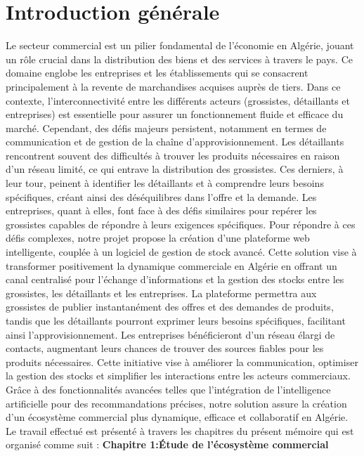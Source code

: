 \documentclass[edit,12pt,a4paper,ChapStyle,oneside,doubleinterligne]{report}
\begin{document}
\chapter*{Introduction générale}
Le secteur commercial est un pilier fondamental de l'économie en Algérie, jouant un rôle crucial dans la distribution des biens et des services à travers le pays. Ce domaine englobe les entreprises et les établissements qui se consacrent principalement à la revente de marchandises acquises auprès de tiers. Dans ce contexte, l'interconnectivité entre les différents acteurs (grossistes, détaillants et entreprises) est essentielle pour assurer un fonctionnement fluide et efficace du marché. Cependant, des défis majeurs persistent, notamment en termes de communication et de gestion de la chaîne d'approvisionnement.
\newline \phantom{hassane} \newline
Les détaillants rencontrent souvent des difficultés à trouver les produits nécessaires en raison d'un réseau limité, ce qui entrave la distribution des grossistes. Ces derniers, à leur tour, peinent à identifier les détaillants et à comprendre leurs besoins spécifiques, créant ainsi des déséquilibres dans l'offre et la demande. Les entreprises, quant à elles, font face à des défis similaires pour repérer les grossistes capables de répondre à leurs exigences spécifiques.
\newline \phantom{hassane} \newline
Pour répondre à ces défis complexes, notre projet propose la création d'une plateforme web intelligente, couplée à un logiciel de gestion de stock avancé. Cette solution vise à transformer positivement la dynamique commerciale en Algérie en offrant un canal centralisé pour l'échange d'informations et la gestion des stocks entre les grossistes, les détaillants et les entreprises. La plateforme permettra aux grossistes de publier instantanément des offres et des demandes de produits, tandis que les détaillants pourront exprimer leurs besoins spécifiques, facilitant ainsi l'approvisionnement. Les entreprises bénéficieront d'un réseau élargi de contacts, augmentant leurs chances de trouver des sources fiables pour les produits nécessaires.
\newline \phantom{hassane} \newline
Cette initiative vise à améliorer la communication, optimiser la gestion des stocks et simplifier les interactions entre les acteurs commerciaux. Grâce à des fonctionnalités avancées telles que l'intégration de l'intelligence artificielle pour des recommandations précises, notre solution assure la création d'un écosystème commercial plus dynamique, efficace et collaboratif en Algérie.
\newpage
Le travail effectué est présenté à travers les chapitres du présent mémoire qui est
 organisé comme suit :
 \newline
\newline\phantom{Ch}\textbf{Chapitre 1:Étude de l'écosystème commercial }
\end{document}
